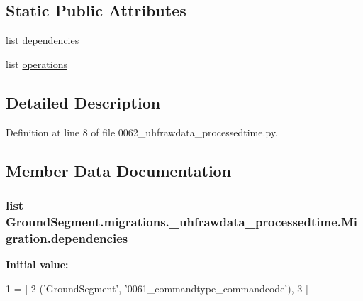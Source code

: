 \subsection*{Static Public Attributes}
\begin{DoxyCompactItemize}
\item 
list \hyperlink{class_ground_segment_1_1migrations_1_10062__uhfrawdata__processedtime_1_1_migration_aadd42c93d7a3c8750e359a8001f91d33}{dependencies}
\item 
list \hyperlink{class_ground_segment_1_1migrations_1_10062__uhfrawdata__processedtime_1_1_migration_a73b5ad595e2671c050deeea914ec0daf}{operations}
\end{DoxyCompactItemize}


\subsection{Detailed Description}


Definition at line 8 of file 0062\+\_\+uhfrawdata\+\_\+processedtime.\+py.



\subsection{Member Data Documentation}
\hypertarget{class_ground_segment_1_1migrations_1_10062__uhfrawdata__processedtime_1_1_migration_aadd42c93d7a3c8750e359a8001f91d33}{}
\subsubsection[{dependencies}]{\setlength{\rightskip}{0pt plus 5cm}list Ground\+Segment.\+migrations.\+\_\+uhfrawdata\+\_\+processedtime.\+Migration.\+dependencies\hspace{0.3cm}{\ttfamily [static]}}\label{class_ground_segment_1_1migrations_1_10062__uhfrawdata__processedtime_1_1_migration_aadd42c93d7a3c8750e359a8001f91d33}
{\bfseries Initial value\+:}
\begin{DoxyCode}
1 = [
2         (\textcolor{stringliteral}{'GroundSegment'}, \textcolor{stringliteral}{'0061\_commandtype\_commandcode'}),
3     ]
\end{DoxyCode}



